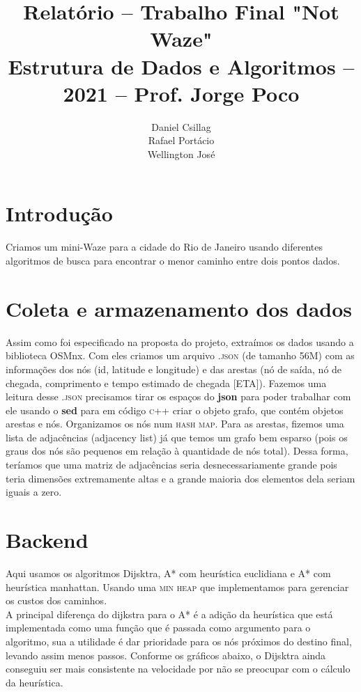 \documentclass{article}
\title{Relatório -- Trabalho Final "Not Waze"\\
       \large Estrutura de Dados e Algoritmos -- 2021 -- Prof. Jorge Poco}
\author{Daniel Csillag \\ Rafael Portácio \\ Wellington José}
\begin{document}
\maketitle

\section{Introdução}
Criamos um mini-Waze para a cidade do Rio de Janeiro usando diferentes algoritmos de busca para encontrar o menor caminho entre dois pontos dados. 

\section{Coleta e armazenamento dos dados}

Assim como foi especificado na proposta do projeto, extraímos os dados usando a biblioteca OSMnx. Com eles criamos um arquivo \textsc{.json} (de tamanho 56M) com as informações dos nós (id, latitude e longitude) e das arestas (nó de saída, nó de chegada, comprimento e tempo estimado de chegada [ETA]). Fazemos uma leitura desse \textsc{.json} precisamos tirar os espaços do \textbf{json} para poder trabalhar com ele usando o \textbf{sed} para em código \textsc{c++} criar o objeto grafo, que contém objetos arestas e nós. Organizamos os nós num \textsc{hash map}. Para as arestas, fizemos uma lista de adjacências (adjacency list) já que temos um grafo bem esparso (pois os graus dos nós são pequenos em relação à quantidade de nós total). Dessa forma, teríamos que uma matriz de adjacências seria desnecessariamente grande pois teria dimensões extremamente altas e a grande maioria dos elementos dela seriam iguais a zero.

\section{Backend}

Aqui usamos os algoritmos Dijsktra, A* com heurística euclidiana e A* com heurística manhattan. Usando uma \textsc{min heap} que implementamos para gerenciar os custos dos caminhos. \\

A principal diferença do dijkstra para o A* é a adição da heurística que está implementada como uma função que é passada como argumento para o algoritmo, sua a utilidade é dar prioridade para os nós próximos do destino final, levando assim menos passos. Conforme os gráficos abaixo, o Dijsktra ainda conseguiu ser mais consistente na velocidade por não se preocupar com o cálculo da heurística.
\end{document}

